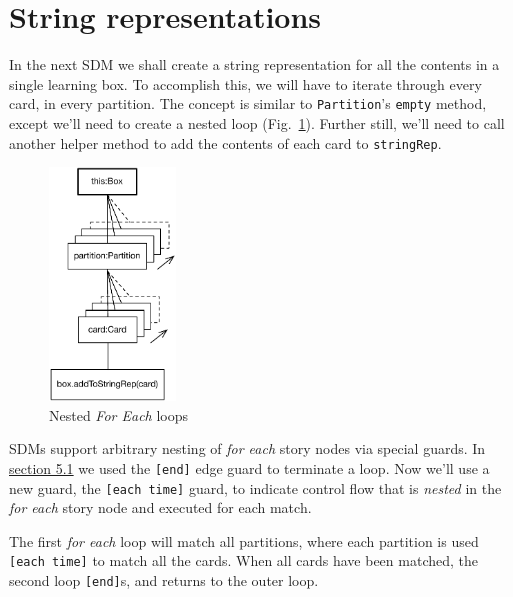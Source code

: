 \newpage
\hypertarget{sec:stringRep}{}
\section{String representations}
\genHeader

In the next SDM we shall create a string representation for all the contents in a single learning box. To accomplish this, we will have to iterate through 
every card, in every partition. The concept is similar to \texttt{Partition}'s \texttt{empty} method, except we'll need to create a nested loop 
(Fig.~\ref{fig:goal_stringRep}). Further still, we'll need to call another helper method to add the contents of each card to \texttt{stringRep}.

\vspace{1cm}

\begin{figure}[htbp]
	\centering
	\includegraphics[width=0.3\textwidth]{goal_stringRep.pdf}
	\caption{Nested \emph{For Each} loops}
	\label{fig:goal_stringRep}
\end{figure}

\vspace{1cm}

SDMs support arbitrary nesting of \emph{for each} story nodes via special guards. In \hyperlink{emptyPartition vis}{section 5.1} we used the \texttt{[end]} edge
guard to terminate a loop. Now we'll use a new guard, the \texttt{[each time]} guard, to indicate control flow that is \emph{nested} in
the \emph{for each} story node and executed for each match.

\vspace{0.5cm}

The first \emph{for each} loop will match all partitions, where each partition is used \texttt{[each time]} to match all the cards.  When 
all cards have been matched, the second loop \texttt{[end]}s, and returns to the outer loop.

